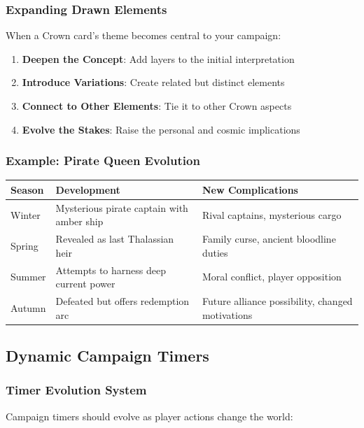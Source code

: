 \documentclass[11pt]{article}
\begin{document}
\subsubsection{Expanding Drawn Elements}

When a Crown card's theme becomes central to your campaign:

\begin{enumerate}
  \item \textbf{Deepen the Concept}: Add layers to the initial interpretation
  \item \textbf{Introduce Variations}: Create related but distinct elements
  \item \textbf{Connect to Other Elements}: Tie it to other Crown aspects
  \item \textbf{Evolve the Stakes}: Raise the personal and cosmic implications
\end{enumerate}

\subsubsection{Example: Pirate Queen Evolution}

\begin{longtable}{|p{2.5cm}|p{5cm}|p{5cm}|}
\hline
\textbf{Season} & \textbf{Development} & \textbf{New Complications} \\
\hline
Winter & Mysterious pirate captain with amber ship & Rival captains, mysterious cargo \\
\hline
Spring & Revealed as last Thalassian heir & Family curse, ancient bloodline duties \\
\hline
Summer & Attempts to harness deep current power & Moral conflict, player opposition \\
\hline
Autumn & Defeated but offers redemption arc & Future alliance possibility, changed motivations \\
\hline
\end{longtable}

\subsection{Dynamic Campaign Timers}

\subsubsection{Timer Evolution System}

Campaign timers should evolve as player actions change the world:
\end{document}
